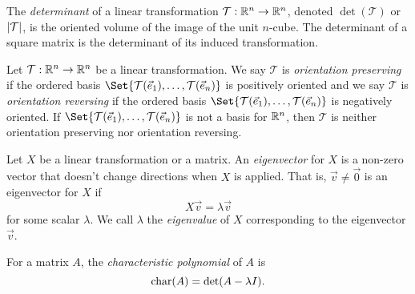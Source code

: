 \begin{SaveDefinition}[key=Determinant, title={Determinant}]
	The
	\emph{determinant} of a linear transformation $\mathcal T:\mathbb{R}^{n}\to \mathbb{R}^{n}$, denoted $\det(\mathcal T)$ or $\lvert\mathcal T\rvert$, is
	the oriented volume of the image of the unit $n$-cube. The determinant of
	a square matrix is the determinant of its induced transformation.
\end{SaveDefinition}

\begin{SaveDefinition}[key=OrientationPreservingLinearTransformation, title={Orientation Preserving Linear Transformation}]
	Let $\mathcal T:\mathbb{R}^n\to\mathbb{R}^n$ be a linear transformation. We say $\mathcal T$
	is \emph{orientation preserving} if the ordered basis $\Set{\mathcal T(\vec e_1),\ldots, \mathcal T(\vec e_n)}$
	is positively oriented  and we say $\mathcal T$
	is \emph{orientation reversing} if the ordered basis $\Set{\mathcal T(\vec e_1),\ldots, \mathcal T(\vec e_n)}$
	is negatively oriented. If $\Set{\mathcal T(\vec e_1),\ldots, \mathcal T(\vec e_n)}$
	is not a basis for $\mathbb{R}^n$, then $\mathcal T$ is neither orientation preserving nor orientation reversing.
\end{SaveDefinition}

\begin{SaveDefinition}[key=Eigenvector, title={Eigenvector}]
	Let $X$ be a linear transformation or a matrix. An
	\emph{eigenvector} for $X$ is a non-zero vector that doesn't change
	directions when $X$ is applied. That is, $\vec v\neq \vec 0$ is an
	eigenvector for $X$ if
	\[
		X\vec v=\lambda \vec v
	\]
	 for some scalar $\lambda$. We call $\lambda$ the
	\emph{eigenvalue} of $X$ corresponding to the eigenvector $\vec v$.
\end{SaveDefinition}

\begin{SaveDefinition}[
	key=CharacteristicPolynomial,
	title={Characteristic Polynomial}]

	For a matrix $A$, the
	\emph{characteristic polynomial} of $A$ is
	\[
		\operatorname{char}(A)=\det(A-\lambda I).
	\]

\end{SaveDefinition}

